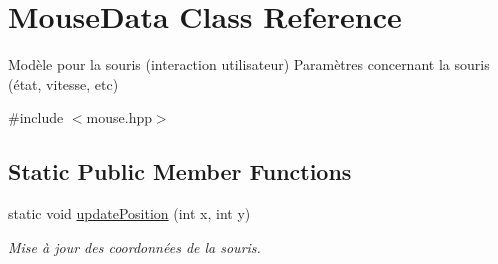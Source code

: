 \hypertarget{class_mouse_data}{\section{Mouse\+Data Class Reference}
\label{class_mouse_data}
}


Modèle pour la souris (interaction utilisateur) Paramètres concernant la souris (état, vitesse, etc)  




{\ttfamily \#include $<$mouse.\+hpp$>$}

\subsection*{Static Public Member Functions}
\begin{DoxyCompactItemize}
\item 
static void \hyperlink{class_mouse_data_aee9c88eaf22f3ca6dce4d12ac60604b3}{update\+Position} (int x, int y)
\begin{DoxyCompactList}\small\item\em Mise à jour des coordonnées de la souris. \end{DoxyCompactList}\end{DoxyCompactItemize}
